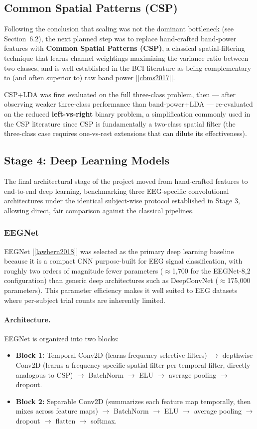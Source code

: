 \documentclass[11pt,a4paper]{article}
\renewcommand{\cite}[1]{[\ref{#1}]}
\begin{document}
\subsection{Common Spatial Patterns (CSP)}
Following the conclusion that scaling was not the dominant bottleneck (see Section~6.2), the next planned step was to replace hand-crafted band-power features with \textbf{Common Spatial Patterns (CSP)}, a classical spatial-filtering technique that learns channel weightings maximizing the variance ratio between two classes, and is well established in the BCI literature as being complementary to (and often superior to) raw band power \cite{cbms2017}.

CSP+LDA was first evaluated on the full three-class problem, then --- after observing weaker three-class performance than band-power+LDA --- re-evaluated on the reduced \textbf{left-vs-right} binary problem, a simplification commonly used in the CSP literature since CSP is fundamentally a two-class spatial filter (the three-class case requires one-vs-rest extensions that can dilute its effectiveness).

\subsection{Stage 4: Deep Learning Models}
The final architectural stage of the project moved from hand-crafted features to end-to-end deep learning, benchmarking three EEG-specific convolutional architectures under the identical subject-wise protocol established in Stage 3, allowing direct, fair comparison against the classical pipelines.

\subsubsection{EEGNet}
EEGNet \cite{lawhern2018} was selected as the primary deep learning baseline because it is a compact CNN purpose-built for EEG signal classification, with roughly two orders of magnitude fewer parameters ($\approx$1,700 for the EEGNet-8,2 configuration) than generic deep architectures such as DeepConvNet ($\approx$175,000 parameters). This parameter efficiency makes it well suited to EEG datasets where per-subject trial counts are inherently limited.

\paragraph{Architecture.} EEGNet is organized into two blocks:
\begin{itemize}[leftmargin=1.5em]
    \item \textbf{Block 1:} Temporal Conv2D (learns frequency-selective filters) $\rightarrow$ depthwise Conv2D (learns a frequency-specific spatial filter per temporal filter, directly analogous to CSP) $\rightarrow$ BatchNorm $\rightarrow$ ELU $\rightarrow$ average pooling $\rightarrow$ dropout.
    \item \textbf{Block 2:} Separable Conv2D (summarizes each feature map temporally, then mixes across feature maps) $\rightarrow$ BatchNorm $\rightarrow$ ELU $\rightarrow$ average pooling $\rightarrow$ dropout $\rightarrow$ flatten $\rightarrow$ softmax.
\end{itemize}
\end{document}
